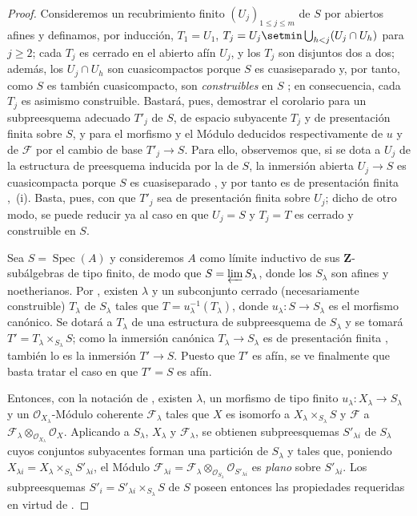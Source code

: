 \begin{proof}
Consideremos un recubrimiento finito $(U_j)_{1\leq j\leq m}$ de $S$ por abiertos afines y definamos, por inducción, $T_1=U_1$, $T_j=U_j\setmin\bigcup_{h<j}(U_j\cap U_h)$ para $j\geq2$; cada $T_j$ es cerrado en el abierto afín $U_j$, y los $T_j$ son disjuntos dos a dos; además, los $U_j\cap U_h$ son cuasicompactos porque $S$ es cuasiseparado y, por tanto, como $S$ es también cuasicompacto, son \emph{construibles} en $S$ ; en consecuencia, cada $T_j$ es asimismo construible.
Bastará, pues, demostrar el corolario para un subpreesquema adecuado $T'_j$ de $S$, de espacio subyacente $T_j$ y de presentación finita sobre $S$, y para el morfismo y el Módulo deducidos respectivamente de $u$ y de $\mathcal F$ por el cambio de base $T'_j\to S$.
Para ello, observemos que, si se dota a $U_j$ de la estructura de preesquema inducida por la de $S$, la inmersión abierta $U_j\to S$ es cuasicompacta porque $S$ es cuasiseparado , y por tanto es de
presentación finita ,~(i).
Basta, pues, con que $T'_j$ sea de presentación finita sobre $U_j$; dicho de otro modo, se puede reducir ya al caso en que $U_j=S$ y $T_j=T$ es cerrado y construible en $S$.

Sea $S=\operatorname{Spec}(A)$ y consideremos $A$ como límite inductivo de sus $\mathbf Z$-subálgebras de tipo finito, de modo que $S=\varprojlim S_\lambda$, donde los $S_\lambda$ son afines y noetherianos.
Por , existen $\lambda$ y un subconjunto cerrado (necesariamente construible) $T_\lambda$ de $S_\lambda$ tales que $T=u_\lambda^{-1}(T_\lambda)$, donde $u_\lambda:S\to S_\lambda$ es el morfismo canónico.
Se dotará a $T_\lambda$ de una estructura de subpreesquema de $S_\lambda$ y se tomará $T'=T_\lambda\times_{S_\lambda}S$; como la inmersión canónica $T_\lambda\to S_\lambda$ es de presentación finita , también lo es la inmersión $T'\to S$.
Puesto que $T'$ es afín, se ve finalmente que basta tratar el caso en que $T'=S$ es afín.

Entonces, con la notación de , existen $\lambda$, un morfismo de tipo finito $u_\lambda:X_\lambda\to S_\lambda$ y un $\mathcal O_{X_\lambda}$-Módulo coherente $\mathcal F_\lambda$ tales que $X$ es isomorfo a $X_\lambda\times_{S_\lambda}S$ y $\mathcal F$ a $\mathcal F_\lambda\otimes_{\mathcal O_{X_\lambda}}\mathcal O_X$.
Aplicando  a $S_\lambda$, $X_\lambda$ y $\mathcal F_\lambda$, se obtienen subpreesquemas $S'_{\lambda i}$ de $S_\lambda$ cuyos conjuntos subyacentes forman una partición de $S_\lambda$ y tales que, poniendo $X_{\lambda i}=X_\lambda\times_{S_\lambda}S'_{\lambda i}$, el Módulo
$\mathcal F_{\lambda i}=\mathcal F_\lambda\otimes_{\mathcal O_{S_\lambda}}
\mathcal O_{S'_{\lambda i}}$
es \emph{plano} sobre $S'_{\lambda i}$.
Los subpreesquemas $S'_i=S'_{\lambda i}\times_{S_\lambda}S$ de $S$ poseen entonces las propiedades requeridas en virtud de .
\end{proof}

